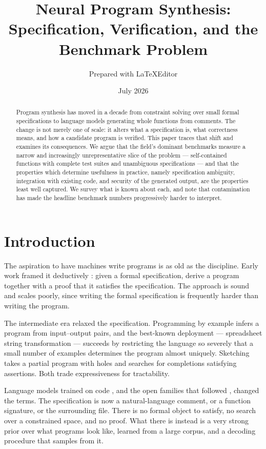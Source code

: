 \documentclass[11pt,a4paper]{article}
\title{Neural Program Synthesis:\\
       Specification, Verification, and the Benchmark Problem}
\author{Prepared with LaTeXEditor}
\date{July 2026}
\begin{document}
\maketitle

\begin{abstract}
Program synthesis has moved in a decade from constraint solving over small
formal specifications to language models generating whole functions from
comments. The change is not merely one of scale: it alters what a
specification is, what correctness means, and how a candidate program is
verified. This paper traces that shift and examines its consequences. We argue
that the field's dominant benchmarks measure a narrow and increasingly
unrepresentative slice of the problem --- self-contained functions with
complete test suites and unambiguous specifications --- and that the
properties which determine usefulness in practice, namely specification
ambiguity, integration with existing code, and security of the generated
output, are the properties least well captured. We survey what is known about
each, and note that contamination has made the headline benchmark numbers
progressively harder to interpret.
\end{abstract}

\tableofcontents

\section{Introduction}
\label{sec:intro}

The aspiration to have machines write programs is as old as the discipline.
Early work framed it deductively \cite{manna1971}: given a formal
specification, derive a program together with a proof that it satisfies the
specification. The approach is sound and scales poorly, since writing the
formal specification is frequently harder than writing the program.

The intermediate era relaxed the specification. Programming by example infers
a program from input--output pairs, and the best-known deployment ---
spreadsheet string transformation \cite{gulwani2011} --- succeeds by
restricting the language so severely that a small number of examples
determines the program almost uniquely. Sketching \cite{solar2008} takes a
partial program with holes and searches for completions satisfying assertions.
Both trade expressiveness for tractability.

Language models trained on code \cite{chen2021}, and the open families that
followed \cite{nijkamp2023, roziere2023}, changed the terms. The
specification is now a natural-language comment, or a function signature, or
the surrounding file. There is no formal object to satisfy, no search over a
constrained space, and no proof. What there is instead is a very strong prior
over what programs look like, learned from a large corpus, and a decoding
procedure that samples from it.
\end{document}
